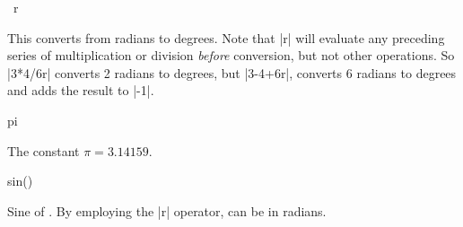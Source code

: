 \begin{math-operator}{\ r}

	This converts  from radians to degrees. Note that |r| will 
	evaluate any preceding series of multiplication or division 
	\emph{before} conversion, but not other operations. So |3*4/6r| 
	converts 2 radians to degrees, but |3-4+6r|, converts 6 radians to
	degrees and adds the result to |-1|.

\begin{codeexample}[post=\tt\footnotesize\pgfmathresult]
\end{codeexample}

\begin{codeexample}[post=\tt\footnotesize\pgfmathresult]
\end{codeexample}

\begin{codeexample}[post=\tt\footnotesize\pgfmathresult]
\end{codeexample}

\end{math-operator}

\begin{math-constant}{pi}

	The constant $\pi=3.14159$.
	
\begin{codeexample}[post=\tt\footnotesize\pgfmathresult]
\end{codeexample}

\begin{codeexample}[post=\tt\footnotesize\pgfmathresult]
\end{codeexample}

\end{math-constant}

\begin{math-function}{sin()}

	Sine of . By employing the |r| operator,  can be in 
	radians.
	
\begin{codeexample}[post=\tt\footnotesize\pgfmathresult]
\end{codeexample}

\begin{codeexample}[post=\tt\footnotesize\pgfmathresult]
\end{codeexample}

\end{math-function}

